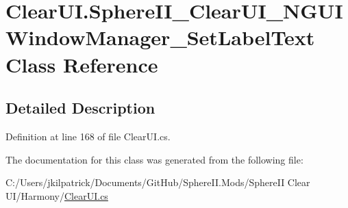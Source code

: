 \hypertarget{class_clear_u_i_1_1_sphere_i_i___clear_u_i___n_g_u_i_window_manager___set_label_text}{}\section{Clear\+U\+I.\+Sphere\+I\+I\+\_\+\+Clear\+U\+I\+\_\+\+N\+G\+U\+I\+Window\+Manager\+\_\+\+Set\+Label\+Text Class Reference}
\label{class_clear_u_i_1_1_sphere_i_i___clear_u_i___n_g_u_i_window_manager___set_label_text}


\subsection{Detailed Description}


Definition at line 168 of file Clear\+U\+I.\+cs.



The documentation for this class was generated from the following file\+:\begin{DoxyCompactItemize}
\item 
C\+:/\+Users/jkilpatrick/\+Documents/\+Git\+Hub/\+Sphere\+I\+I.\+Mods/\+Sphere\+I\+I Clear U\+I/\+Harmony/\mbox{\hyperlink{_clear_u_i_8cs}{Clear\+U\+I.\+cs}}\end{DoxyCompactItemize}
